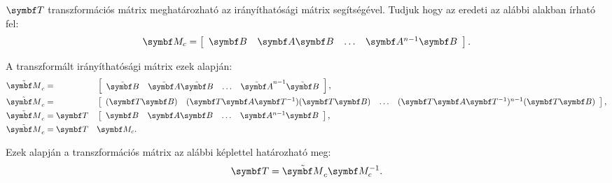 $\rmat T$ transzformációs mátrix meghatározható az irányíthatósági mátrix
segítségével. Tudjuk hogy az eredeti az alábbi alakban írható fel:
\bgroup
{}
\def\arraystretch{1.2}
\begin{equation}
  \rmat M_c = \left[\begin{array}{ c : c : c : c }
      \rmat B         &
      \rmat A \rmat B &
      \dots           &
      \rmat A^{n-1} \rmat B
    \end{array}\right]
  .
  \label{eq:M_c-og}
\end{equation}
\egroup

A transzformált irányíthatósági mátrix ezek alapján:
\bgroup
{}
\def\arraystretch{1.2}
\begin{alignat}{9}
  \tmat M_c
   & =         &  & \left[\begin{array}{ c : c : c : c }
                              \tmat B         &
                              \tmat A \tmat B &
                              \dots           &
                              \tmat A^{n-1} \tmat B
                            \end{array}\right],
  \\
  \tmat M_c
   & =         &  & \left[\begin{array}{ c : c : c : c }
                              (\rmat T \rmat B)                                &
                              (\rmat T \rmat A \rmat T^{-1}) (\rmat T \rmat B) &
                              \dots                                            &
                              (\rmat T \rmat A \rmat T^{-1})^{n-1} (\rmat T \rmat B)
                            \end{array}\right],
  \\
  \tmat M_c
   & = \rmat T &  & \left[\begin{array}{ c : c : c : c }
                              \rmat B         &
                              \rmat A \rmat B &
                              \dots           &
                              \rmat A^{n-1} \rmat B
                            \end{array}\right],
  \\
  \tmat M_c
   & = \rmat T &  & \rmat M_c.
\end{alignat}
\egroup

Ezek alapján a transzformációs mátrix az alábbi képlettel határozható meg:
\begin{equation}
  \rmat T = \tmat M_c \rmat M_c^{-1}.
  \label{eq:T-calc}
\end{equation}

